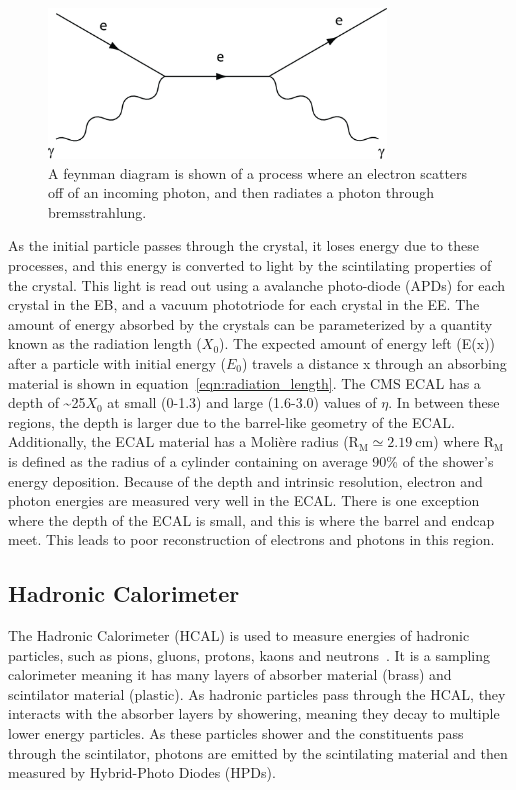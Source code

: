 \begin{figure}[!ht]
\begin{center}
\includegraphics[width=0.8\textwidth]{cms/figs/photon_brem.png}
\caption{
  A feynman diagram is shown of a process where an electron scatters off of an incoming photon,
  and then radiates a photon through bremsstrahlung.
\label{fig:photon_brem}
}
\end{center}
\end{figure}

As the initial particle passes through the crystal, it loses energy due to these processes, and this energy is converted to light by the scintilating properties of the crystal.
This light is read out using a avalanche photo-diode (APDs) for each crystal in the EB, and a vacuum phototriode for each crystal in the EE.
The amount of energy absorbed by the crystals can be parameterized by a quantity known as the radiation length ($X_{0}$).
The expected amount of energy left (E(x)) after a particle with initial energy ($E_{0}$)
travels a distance x through an absorbing material is shown in equation~\ref{eqn:radiation_length}.
The CMS ECAL has a depth of \textasciitilde{}25$X_{0}$ at small (0-1.3) and large (1.6-3.0) values of $\eta$.
In between these regions, the depth is larger due to the barrel-like geometry of the ECAL.
Additionally, the ECAL material has a Moli\`ere radius ($\mathrm{R_{M} \simeq 2.19~cm}$) where
$\mathrm{R_{M}}$ is defined as the radius of a cylinder containing on average 90\% of the shower's energy deposition.
Because of the depth and intrinsic resolution, electron and photon energies are measured very well in the ECAL.
There is one exception where the depth of the ECAL is small, and this is where the barrel and endcap meet.
This leads to poor reconstruction of electrons and photons in this region.

\subsection{Hadronic Calorimeter}
\label {subs:HCAL}
The Hadronic Calorimeter (HCAL) is used to measure energies of hadronic particles, such as pions, gluons, protons, kaons and neutrons~\cite{hcalperformance}.
It is a sampling calorimeter meaning it has many layers of absorber material (brass) and scintilator material (plastic).
As hadronic particles pass through the HCAL, they interacts with the absorber layers by showering, meaning they decay to multiple lower energy particles.
As these particles shower and the constituents pass through the scintilator, photons are emitted by the scintilating material and then measured by Hybrid-Photo Diodes (HPDs).

